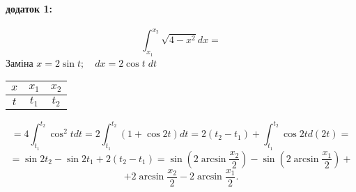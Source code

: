 \documentclass[a4paper, 20pt, titlepage]{article}
\begin{document}
\begin{spacing}{1.4}
\newpage{}

\paragraph{додаток 1:}
\hfill \break

\[\int_{x_1}^{x_2}\sqrt{4-x^2}dx=\]
Заміна $x=2\sin{t};\quad dx=2\cos{t}\;dt$
\begin{center}
    \begin{tabular}{|c|c|c|}
            \hline
            $x$ & $x_1$ & $x_2$  \\
            \hline
            $t$ & $t_1$ & $t_2$  \\
            \hline
    \end{tabular}
\end{center}

\[=4\int_{t_1}^{t_2}\cos^2{t}dt=2\int_{t_1}^{t_2}(1+\cos{2t})dt=2(t_2-t_1)+\int_{t_1}^{t_2}\cos{2t}d(2t)=\]\[=\sin{2t_2}-\sin{2t_1}+2(t_2-t_1)=\sin{\left(2\arcsin{\frac{x_2}{2}}\right)}-\sin{\left(2\arcsin{\frac{x_1}{2}}\right)}+\]\[+2\arcsin{\frac{x_2}{2}}-2\arcsin{\frac{x_1}{2}}.\]















\end{spacing}
\end{document}
